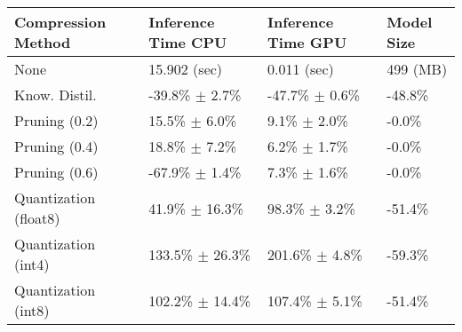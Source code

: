 \begin{tabular}{llll}
\toprule
\textbf{Compression Method} & \textbf{Inference Time CPU} & \textbf{Inference Time GPU} & \textbf{Model Size} \\
\midrule
None & 15.902 (sec) & 0.011 (sec) & 499 (MB) \\
Know. Distil. & -39.8\% $\pm$ 2.7\% & -47.7\% $\pm$ 0.6\% & -48.8\% \\
Pruning (0.2) & 15.5\% $\pm$ 6.0\% & 9.1\% $\pm$ 2.0\% & -0.0\% \\
Pruning (0.4) & 18.8\% $\pm$ 7.2\% & 6.2\% $\pm$ 1.7\% & -0.0\% \\
Pruning (0.6) & -67.9\% $\pm$ 1.4\% & 7.3\% $\pm$ 1.6\% & -0.0\% \\
Quantization (float8) & 41.9\% $\pm$ 16.3\% & 98.3\% $\pm$ 3.2\% & -51.4\% \\
Quantization (int4) & 133.5\% $\pm$ 26.3\% & 201.6\% $\pm$ 4.8\% & -59.3\% \\
Quantization (int8) & 102.2\% $\pm$ 14.4\% & 107.4\% $\pm$ 5.1\% & -51.4\% \\
\bottomrule
\end{tabular}
